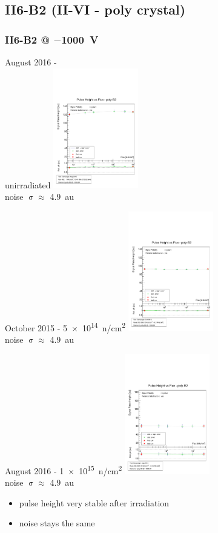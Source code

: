 \documentclass[9pt]{beamer}
\begin{document}
\subsection{II6-B2 (II-VI - poly crystal)}
\begin{frame}
	\frametitle{II6-B2 @ $-$\SI{1000}{V}}
	\begin{minipage}{3.7cm}
		\centering
		August 2016 - \\unirradiated
		\includegraphics[width=3.7cm]{CPH1508_13_2.pdf}\\
		noise $\upsigma\approx$ \SI{4.9}{au}
	\end{minipage}
	\hspace*{2pt}
	\begin{minipage}{3.7cm}
		\centering
		October 2015 - \SI[exponent-product = \cdot]{5e14}{n/cm^{2}}
		\includegraphics[width=3.7cm]{CPH1510_08_2.pdf}\\
		noise $\upsigma\approx$ \SI{4.9}{au}
	\end{minipage}
	\hspace*{2pt}
	\begin{minipage}{3.7cm}
		\centering
		August 2016 - \SI[exponent-product = \cdot]{1e15}{n/cm^{2}}
		\includegraphics[width=3.7cm]{CPH1608_09_1_2.pdf}\\
		noise $\upsigma \approx$ \SI{4.9}{au}
	\end{minipage}\s
	\begin{itemize}
		\item pulse height very stable after irradiation
		\item noise stays the same
	\end{itemize}
\end{frame}
\end{document}
